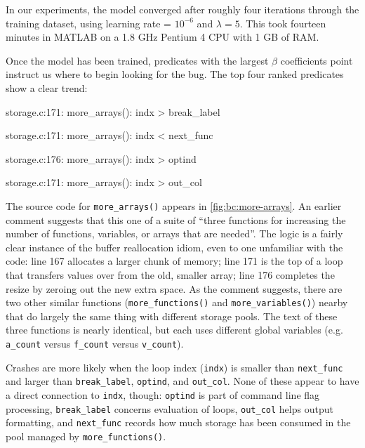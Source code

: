 In our experiments, the model converged after roughly four iterations
through the training dataset, using learning rate = $10^{-6}$ and
$\lambda = 5$.  This took fourteen minutes in MATLAB on a 1.8 GHz
Pentium 4 CPU with 1 GB of RAM.

Once the model has been trained, predicates with the largest $\beta$
coefficients point instruct us where to begin looking for the bug.
The top four ranked predicates show a clear trend:

\begin{list}{.}{\setlength{\itemsep}{0pt}\setlength{\parsep}{0in}\ttfamily\small}
\item storage.c:171: more\_arrays(): indx > break\_label
\item storage.c:171: more\_arrays(): indx < next\_func
\item storage.c:176: more\_arrays(): indx > optind
\item storage.c:171: more\_arrays(): indx > out\_col
\end{list}

The source code for \texttt{more\_arrays()} appears in
\autoref{fig:bc:more-arrays}.  An earlier comment suggests that this
one of a suite of ``three functions for increasing the number of
functions, variables, or arrays that are needed''.  The logic is a
fairly clear instance of the buffer reallocation idiom, even to one
unfamiliar with the code: line 167 allocates a larger chunk of memory;
line 171 is the top of a loop that transfers values over from the old,
smaller array; line 176 completes the resize by zeroing out the new
extra space.  As the comment suggests, there are two other similar
functions (\texttt{more\_functions()} and \texttt{more\_variables()})
nearby that do largely the same thing with different storage pools.
The text of these three functions is nearly identical, but each uses
different global variables (e.g. \texttt{a\_count} versus
\texttt{f\_count} versus \texttt{v\_count}).

Crashes are more likely when the loop index (\texttt{indx}) is smaller
than \texttt{next\_func} and larger than \texttt{break\_label},
\texttt{optind}, and \texttt{out\_col}.  None of these appear to have
a direct connection to \texttt{indx}, though: \texttt{optind} is part
of command line flag processing, \texttt{break\_label} concerns
evaluation of loops, \texttt{out\_col} helps output formatting, and
\texttt{next\_func} records how much storage has been consumed in the
pool managed by \texttt{more\_functions()}.

